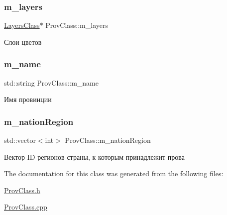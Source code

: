 \subsubsection{\texorpdfstring{m\+\_\+layers}{m\_layers}}
{\footnotesize\ttfamily \hyperlink{class_layers_class}{Layers\+Class}$\ast$ Prov\+Class\+::m\+\_\+layers\hspace{0.3cm}{\ttfamily [private]}}



Слои цветов 

\mbox{\label{class_prov_class_ad6197fa9253423daa8bfe5d8020547b5}} 
\subsubsection{\texorpdfstring{m\+\_\+name}{m\_name}}
{\footnotesize\ttfamily std\+::string Prov\+Class\+::m\+\_\+name\hspace{0.3cm}{\ttfamily [private]}}



Имя провинции 

\mbox{\label{class_prov_class_a8a75f6c2e83d2b02a94105ebdfb8aa56}} 
\subsubsection{\texorpdfstring{m\+\_\+nation\+Region}{m\_nationRegion}}
{\footnotesize\ttfamily std\+::vector$<$int$>$ Prov\+Class\+::m\+\_\+nation\+Region\hspace{0.3cm}{\ttfamily [private]}}



Вектор ID регионов страны, к которым принадлежит прова 



The documentation for this class was generated from the following files\+:\begin{DoxyCompactItemize}
\item 
\hyperlink{_prov_class_8h}{Prov\+Class.\+h}\item 
\hyperlink{_prov_class_8cpp}{Prov\+Class.\+cpp}\end{DoxyCompactItemize}
